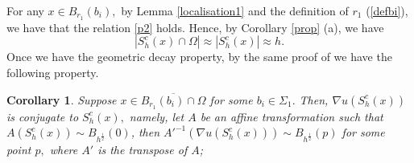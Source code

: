 \documentclass[11pt]{amsart}
\theoremstyle{plain}
\newtheorem{corollary}{Corollary}[section]
\newcommand{\0}{\textbf{0}}
\numberwithin{equation}{section}
\numberwithin{equation}{section}
\numberwithin{figure}{section}
\begin{document}
	For any $x\in B_{r_1}(b_i),$ by Lemma \ref{localisation1} and  the definition of $r_1$ (\eqref{defbi}), we have that the relation \eqref{p2} holds. Hence, by Corollary \ref{prop} (a), we have
	\begin{equation}\label{volu1}
		|S^c_h(x)\cap \Omega|\approx |S^c_h(x)|\approx h.
	\end{equation}
	Once we have the geometric decay property, by the same proof of \cite[Corollary 2.2]{C96} we have the following property.
	\begin{corollary}\label{nonconvpart}
		Suppose $x\in \overline{B_{r_1}(b_i)\cap \Omega}$ for some $b_i\in \Sigma_1.$ Then,
		$\nabla u(S^c_h(x))$ is conjugate to $S^c_h(x),$ namely, let $A$ be an affine transformation such that
		$A\left(S^c_h(x)\right)\sim B_{h^{\frac{1}{2}}}(0)$, then $A'^{-1} \left(\nabla u(S^c_h(x))\right)\sim B_{h^{\frac{1}{2}}}(p)$ for some point $p,$
		where $A'$ is the transpose of $A$;
	\end{corollary}
	
	
	
	
	
\end{document}
